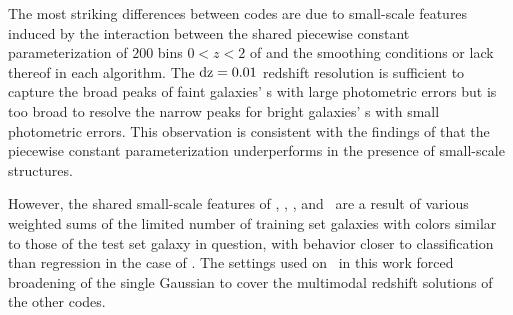 The most striking differences between codes are due to small-scale features induced by the interaction between the shared piecewise constant parameterization of $200$ bins $0 < z < 2$ of  and the smoothing conditions or lack thereof in each algorithm.
The $\rm{d}z = 0.01$ redshift resolution is sufficient to capture the broad peaks of faint galaxies' \pzpdf s with large photometric errors but is too broad to resolve the narrow peaks for bright galaxies' \pzpdf s with small photometric errors.
This observation is consistent with the findings of \citet[]{Malz:qp} that the piecewise constant parameterization underperforms in the presence of small-scale structures.

However, the shared small-scale features of \annz, \metaphor, \cmnn, and \skynet\ are a result of various weighted sums of the limited number of training set galaxies with colors similar to those of the test set galaxy in question, with behavior closer to classification than regression in the case of \annz.
The settings used on \gpz\ in this work forced broadening of the single Gaussian to cover the multimodal redshift solutions of the other codes.

